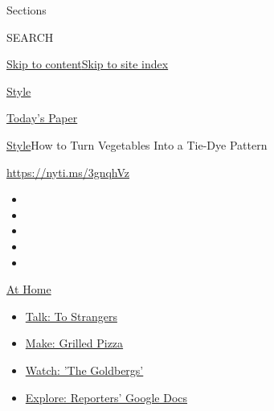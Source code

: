 Sections

SEARCH

\protect\hyperlink{site-content}{Skip to
content}\protect\hyperlink{site-index}{Skip to site index}

\href{https://www.nytimes3xbfgragh.onion/section/style}{Style}

\href{https://myaccount.nytimes3xbfgragh.onion/auth/login?response_type=cookie\&client_id=vi}{}

\href{https://www.nytimes3xbfgragh.onion/section/todayspaper}{Today's
Paper}

\href{/section/style}{Style}\textbar{}How to Turn Vegetables Into a
Tie-Dye Pattern

\href{https://nyti.ms/3gnqhVz}{https://nyti.ms/3gnqhVz}

\begin{itemize}
\item
\item
\item
\item
\item
\end{itemize}

\href{https://www.nytimes3xbfgragh.onion/spotlight/at-home?action=click\&pgtype=Article\&state=default\&region=TOP_BANNER\&context=at_home_menu}{At
Home}

\begin{itemize}
\tightlist
\item
  \href{https://www.nytimes3xbfgragh.onion/2020/08/03/well/family/the-benefits-of-talking-to-strangers.html?action=click\&pgtype=Article\&state=default\&region=TOP_BANNER\&context=at_home_menu}{Talk:
  To Strangers}
\item
  \href{https://www.nytimes3xbfgragh.onion/2020/08/01/at-home/coronavirus-make-pizza-on-a-grill.html?action=click\&pgtype=Article\&state=default\&region=TOP_BANNER\&context=at_home_menu}{Make:
  Grilled Pizza}
\item
  \href{https://www.nytimes3xbfgragh.onion/2020/07/31/arts/television/goldbergs-abc-stream.html?action=click\&pgtype=Article\&state=default\&region=TOP_BANNER\&context=at_home_menu}{Watch:
  'The Goldbergs'}
\item
  \href{https://www.nytimes3xbfgragh.onion/interactive/2020/at-home/even-more-reporters-editors-diaries-lists-recommendations.html?action=click\&pgtype=Article\&state=default\&region=TOP_BANNER\&context=at_home_menu}{Explore:
  Reporters' Google Docs}
\end{itemize}

